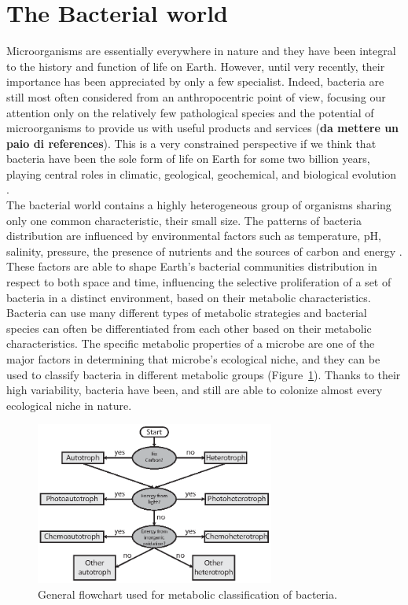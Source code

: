 \section{The Bacterial world}
Microorganisms are essentially everywhere in nature and they have been integral to the history and function of life on Earth. However, until very recently, their importance has been appreciated by only a few specialist. Indeed, bacteria are still most often considered from an anthropocentric point of view, focusing our attention only on the relatively few pathological species and the potential of microorganisms to provide us with useful products and services (\textbf{da mettere un paio di references}). This is a very constrained perspective if we think that bacteria have been the sole form of life on Earth for some two billion years, playing central roles in climatic, geological, geochemical, and biological evolution \cite{cavalier2006cell}.\\
The bacterial world contains a highly heterogeneous group of organisms sharing only one common characteristic, their small size. The patterns of bacteria distribution are influenced by environmental factors such as temperature, pH, salinity, pressure, the presence of nutrients and the sources of carbon and energy \citep{gerhard1986bacterial}. These factors are able to shape Earth's bacterial communities distribution in respect to both space and time, influencing the selective proliferation of a set of bacteria in a distinct environment, based on their metabolic characteristics. Bacteria can use many different types of metabolic strategies and bacterial species can often be differentiated from each other based on their metabolic characteristics. The specific metabolic properties of a microbe are one of the major factors in determining that microbe’s ecological niche, and they can be used to classify bacteria in different metabolic groups (Figure~\ref{fig:bacmet}). Thanks to their high variability, bacteria have been, and still are able to colonize almost every ecological niche in nature.\\
\begin{figure}[!tb]
	\centering
	\includegraphics[width=0.7\textwidth]{./figures/Introduction/bacterial_metabolism_bw}
  	\caption{General flowchart used for metabolic classification of bacteria. \label{fig:bacmet}}
\end{figure}

